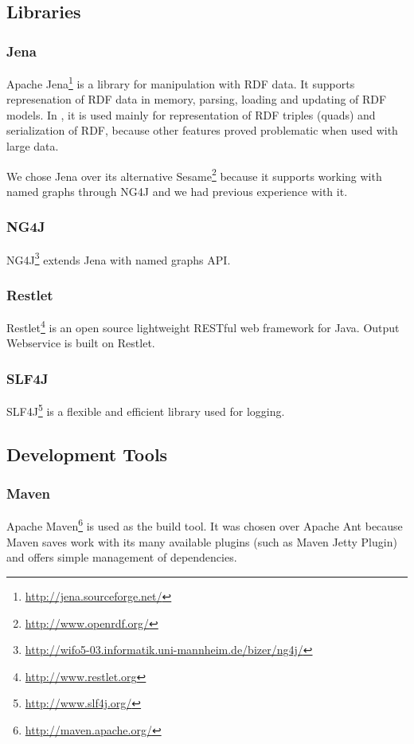 \subsection{Libraries}
\subsubsection*{Jena}
Apache Jena\footnote{\url{http://jena.sourceforge.net/}} is a library for manipulation with RDF data. It supports represenation of RDF data in memory, parsing, loading and updating of RDF models. In \odcs, it is used mainly for representation of RDF triples (quads) and serialization of RDF, because other features proved problematic when used with large data.

We chose Jena over its alternative Sesame\footnote{\url{http://www.openrdf.org/}} because it supports working with named graphs through NG4J and we had previous experience with it.

\subsubsection*{NG4J}
NG4J\footnote{\url{http://wifo5-03.informatik.uni-mannheim.de/bizer/ng4j/}} extends Jena with named graphs API.

\subsubsection*{Restlet}
Restlet\footnote{\url{http://www.restlet.org}} is an open source lightweight RESTful web framework for Java. Output Webservice is built on Restlet.

\subsubsection*{SLF4J}
SLF4J\footnote{\url{http://www.slf4j.org/}} is a flexible and efficient library used for logging. 

\subsection{Development Tools}
\subsubsection*{Maven}
Apache Maven\footnote{\url{http://maven.apache.org/}} is used as the build tool. It was chosen over Apache Ant because Maven saves work with its many available plugins (such as Maven Jetty Plugin) and offers simple management of dependencies.

